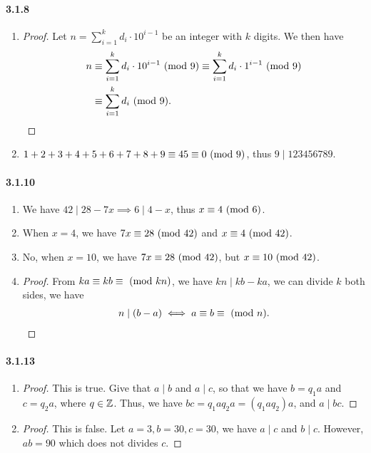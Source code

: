 \documentclass[8pt,twocolumn]{article}
\begin{document}
\paragraph{3.1.8}
\begin{enumerate}
  \item
    \begin{proof}
      Let $n=\sum_{i=1}^k d_i\cdot10^{i-1}$ be an integer with $k$ digits. We then
      have
      \begin{align*}
        n &\equiv \sum_{i=1}^k d_i\cdot10^{i-1} \ (\mathrm{mod}\ 9) \equiv \sum_{i=1}^k d_i\cdot1^{i-1}
        \ (\mathrm{mod}\ 9) \\
        &\equiv \sum_{i=1}^k d_i \ (\mathrm{mod}\ 9).
      \end{align*}
    \end{proof}
  \item $1+2+3+4+5+6+7+8+9\equiv45\equiv0\ (\mathrm{mod}\ 9)$, thus $9\mid123456789$.
\end{enumerate}

\paragraph{3.1.10}
\begin{enumerate}
  \item
    We have $42 \mid 28-7x \implies 6\mid 4-x$, thus $x\equiv 4\ (\mathrm{mod}\ 6)$.
  \item
    When $x = 4$, we have $7x\equiv 28\ (\mathrm{mod}\ 42)$ and $x\equiv 4\ (\mathrm{mod}\ 42)$.
  \item
    No, when $x = 10$, we have $7x\equiv 28\ (\mathrm{mod}\ 42)$, but $x\equiv 10\ (\mathrm{mod}\ 42)$.
  \item
    \begin{proof}
      From $ka\equiv kb \equiv \ (\mathrm{mod}\ kn)$, we have $kn\mid kb-ka$, we can divide $k$ both
      sides, we have
      \begin{align*}
        n\mid(b-a) \iff a\equiv b \equiv \ (\mathrm{mod}\ n).
      \end{align*}
    \end{proof}
\end{enumerate}

\paragraph{3.1.13}
\begin{enumerate}
  \item \begin{proof}
    This is true. Give that $a\mid b$ and $a\mid c$, so that we have $b=q_1 a$
    and $c=q_2 a$, where $q\in \mathbb{Z}$. Thus, we have $bc = q_1a q_2a = (q_1a
    q_2)a$, and $a\mid bc$.
  \end{proof}
  \item \begin{proof}
    This is false. Let $a=3,b=30,c=30$, we have $a\mid c$ and $b\mid c$.
    However, $ab=90$ which does not divides $c$.
  \end{proof}
\end{enumerate}
\end{document}
